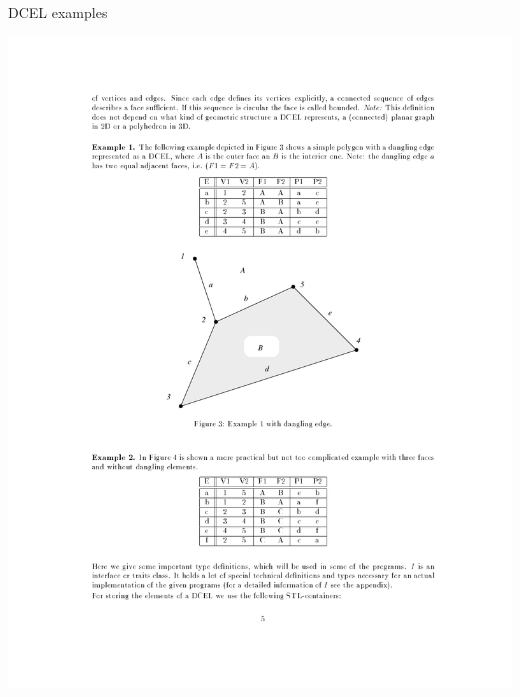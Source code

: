 \documentclass{beamer}
\begin{document}
\begin{frame}{DCEL examples}
    \centering 
    \begin{minipage}[t]{0.45\textwidth}
        \includegraphics[clip, trim=7cm 12cm 6cm 9cm,width=\linewidth]{figures/dcel02} 
    \end{minipage}
    \begin{minipage}[t]{0.45\textwidth}

\end{minipage}
\end{frame}
\end{document}
